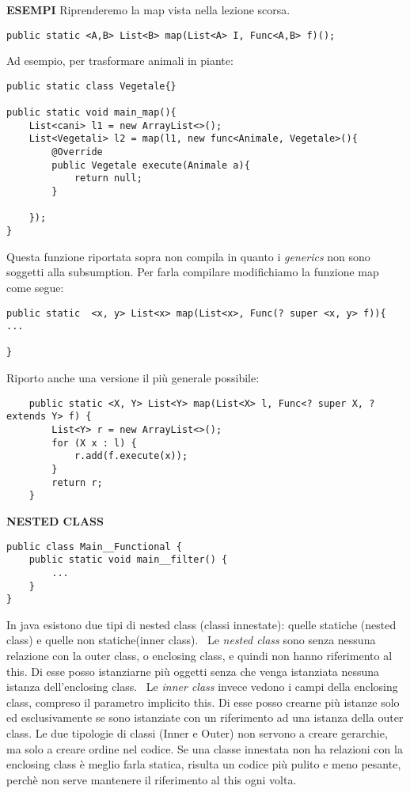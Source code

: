 \noindent \textbf{ESEMPI} \newline
\noindent Riprenderemo la map vista nella lezione scorsa.
\begin{lstlisting}
public static <A,B> List<B> map(List<A> I, Func<A,B> f)();
\end{lstlisting}
Ad esempio, per trasformare animali in piante: 
\begin{lstlisting}
public static class Vegetale{}

public static void main_map(){
	List<cani> l1 = new ArrayList<>();
	List<Vegetali> l2 = map(l1, new func<Animale, Vegetale>(){
		@Override
		public Vegetale execute(Animale a){
			return null;
		}
	
	});
}
\end{lstlisting}
\noindent Questa funzione riportata sopra non compila in quanto i \textit{generics} non sono soggetti alla subsumption. Per farla compilare modifichiamo la funzione map come segue: 

\begin{lstlisting}
public static  <x, y> List<x> map(List<x>, Func(? super <x, y> f)){
...

}
\end{lstlisting}

\noindent Riporto anche una versione il più generale possibile: \newline

\begin{lstlisting}
    public static <X, Y> List<Y> map(List<X> l, Func<? super X, ? extends Y> f) {
        List<Y> r = new ArrayList<>();
        for (X x : l) {
            r.add(f.execute(x));
        }
        return r;
    } 
\end{lstlisting}

\noindent \textbf{NESTED CLASS}\newline
\begin{lstlisting}
public class Main__Functional {
	public static void main__filter() {
		...
	}
}
\end{lstlisting}
In java esistono due tipi di nested class (classi innestate): quelle statiche (nested class) e quelle non statiche(inner class).\newline
\textbullet\ Le \textit{nested class} sono senza nessuna relazione con la outer class, o enclosing class, e quindi non hanno riferimento al this. Di esse posso istanziarne più oggetti senza che venga istanziata nessuna istanza dell'enclosing class. \newline
\textbullet\ Le \textit{inner class} invece vedono i campi della enclosing class, compreso il parametro implicito this. Di esse posso crearne più istanze solo ed esclusivamente se sono istanziate con un riferimento ad una istanza della outer class. \newline
Le due tipologie di classi (Inner e Outer) non servono a creare gerarchie, ma solo a creare ordine nel codice.\newline
Se una classe innestata non ha relazioni con la enclosing class è meglio farla statica, risulta un codice più pulito e meno pesante, perchè non serve mantenere il riferimento al this ogni volta.

